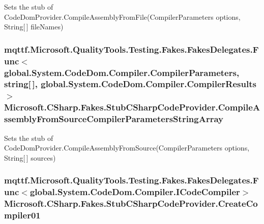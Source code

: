 Sets the stub of Code\-Dom\-Provider.\-Compile\-Assembly\-From\-File(\-Compiler\-Parameters options, String\mbox{[}$\,$\mbox{]} file\-Names)

\hypertarget{class_microsoft_1_1_c_sharp_1_1_fakes_1_1_stub_c_sharp_code_provider_ab495a4ee3550993fb15dd6414f5525fa}{
\subsubsection[{Compile\-Assembly\-From\-Source\-Compiler\-Parameters\-String\-Array}]{\setlength{\rightskip}{0pt plus 5cm}mqttf.\-Microsoft.\-Quality\-Tools.\-Testing.\-Fakes.\-Fakes\-Delegates.\-Func$<$global.\-System.\-Code\-Dom.\-Compiler.\-Compiler\-Parameters, string\mbox{[}$\,$\mbox{]}, global.\-System.\-Code\-Dom.\-Compiler.\-Compiler\-Results$>$ Microsoft.\-C\-Sharp.\-Fakes.\-Stub\-C\-Sharp\-Code\-Provider.\-Compile\-Assembly\-From\-Source\-Compiler\-Parameters\-String\-Array}}\label{class_microsoft_1_1_c_sharp_1_1_fakes_1_1_stub_c_sharp_code_provider_ab495a4ee3550993fb15dd6414f5525fa}


Sets the stub of Code\-Dom\-Provider.\-Compile\-Assembly\-From\-Source(\-Compiler\-Parameters options, String\mbox{[}$\,$\mbox{]} sources)

\hypertarget{class_microsoft_1_1_c_sharp_1_1_fakes_1_1_stub_c_sharp_code_provider_a84110bd4edca05dfc523b9582f1d4e04}{
\subsubsection[{Create\-Compiler01}]{\setlength{\rightskip}{0pt plus 5cm}mqttf.\-Microsoft.\-Quality\-Tools.\-Testing.\-Fakes.\-Fakes\-Delegates.\-Func$<$global.\-System.\-Code\-Dom.\-Compiler.\-I\-Code\-Compiler$>$ Microsoft.\-C\-Sharp.\-Fakes.\-Stub\-C\-Sharp\-Code\-Provider.\-Create\-Compiler01}}\label{class_microsoft_1_1_c_sharp_1_1_fakes_1_1_stub_c_sharp_code_provider_a84110bd4edca05dfc523b9582f1d4e04}


